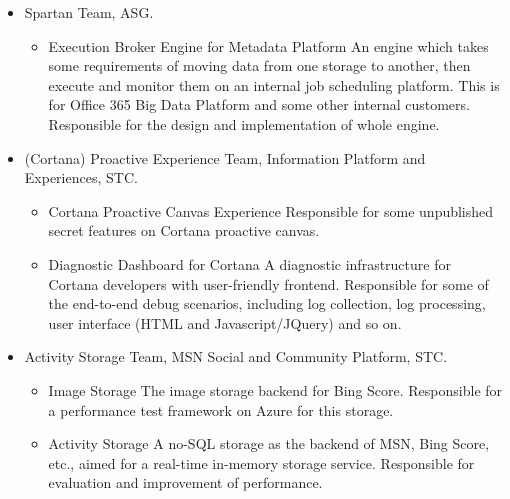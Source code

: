 \documentclass[10pt,a4paper,roman]{moderncv} %
\begin{document}
        {\begin{itemize}%
         \item Spartan Team, ASG.
               \begin{itemize}%
               \item Execution Broker Engine for Metadata Platform\newline{}%
                     An engine which takes some requirements of moving data from one storage to another, then execute and monitor them on an internal job scheduling platform. This is for Office 365 Big Data Platform and some other internal customers.\newline{}%
                     Responsible for the design and implementation of whole engine.
               \end{itemize}
         \item (Cortana) Proactive Experience Team, Information Platform and Experiences, STC.
               \begin{itemize}%
               \item Cortana Proactive Canvas Experience\newline{}%
                     Responsible for some unpublished secret features on Cortana proactive canvas.
               \item Diagnostic Dashboard for Cortana\newline{}%
                     A diagnostic infrastructure for Cortana developers with user-friendly frontend.\newline{}%
                     Responsible for some of the end-to-end debug scenarios, including log collection, log processing, user interface (HTML and Javascript/JQuery) and so on.
               \end{itemize}
         \item Activity Storage Team, MSN Social and Community Platform, STC.
               \begin{itemize}%
               \item Image Storage\newline{}%
                     The image storage backend for Bing Score.\newline{}%
                     Responsible for a performance test framework on Azure for this storage.
               \item Activity Storage\newline{}%
                     A no-SQL storage as the backend of MSN, Bing Score, etc., aimed for a real-time in-memory storage service.\newline{}%
                     Responsible for evaluation and improvement of performance.
               \end{itemize}
         \end{itemize}}
\end{document}
